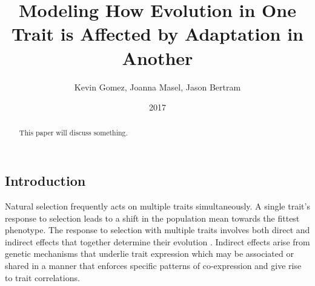 \documentclass[11pt,one column]{article}
\begin{document}
\begin{multicols}{2}

\title{Modeling How Evolution in One Trait is Affected by Adaptation in Another}
\author{Kevin Gomez, Joanna Masel, Jason Bertram}
\date{2017}
\maketitle

\begin{abstract}
This paper will discuss something.
\end{abstract}

\section*{Introduction}
Natural selection frequently acts on multiple traits simultaneously. A single trait’s response to selection leads to a shift in the population mean towards the fittest phenotype.  The response to selection with multiple traits involves both direct and indirect effects that together determine their evolution \cite{Scarcelli23102007,Lovell2013,Wagner2011}.  Indirect effects arise from genetic mechanisms that underlie trait expression which may be associated or shared in a manner that enforces specific patterns of co-expression and give rise to trait correlations.\par


\end{multicols}
\end{document}
